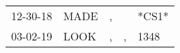 \begin{supertabular}{lllll}
 12-30-18 &  MADE &  , &    &  *CS1* \\
 03-02-19 &  LOOK &  , &  , &   1348 \\
\end{supertabular}
